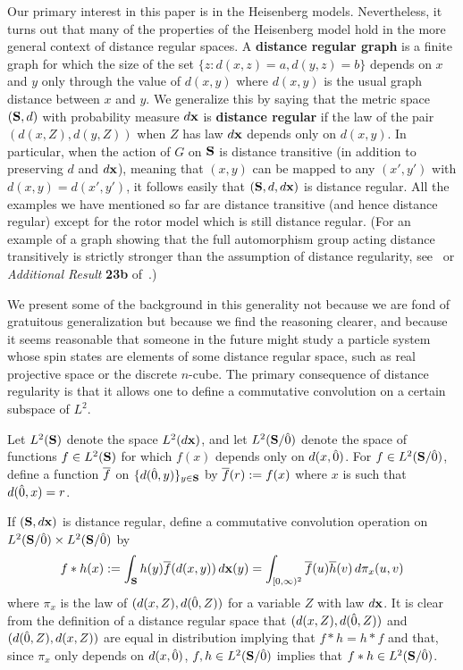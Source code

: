Our primary interest in this paper is in the Heisenberg models.
Nevertheless, it turns out that many of the properties of the Heisenberg model
hold in the more general context of distance regular spaces.
A {\bf distance regular graph} is a finite graph for
which the size of the set $\{ z : d(x,z) = a , d (y,z) = b \}$ 
depends on $x$ and $y$ only through the value of $d(x,y)$ where
$d(x,y)$ is the usual graph distance between $x$ and $y$.
We generalize this by saying that the metric space $(\S,d)$ 
with probability measure 
$\dx$ is {\bf distance regular} if the law of the pair $(d(x,Z) , d(y,Z))$
when $Z$ has law $\dx$ depends only on $d(x,y)$.  
In particular, when the action of $G$ on $\S$ is distance transitive
(in addition to preserving $d$ and $\dx$), 
meaning that $(x,y)$ can be mapped to any $(x' , y')$ with 
$d(x,y) = d(x' , y')$, it follows easily that $(\S,d, \dx)$ is 
distance regular.  All the examples we have mentioned so far are distance 
transitive (and hence distance regular) 
except for the rotor model which is still distance regular.
(For an example of a graph showing that the full automorphism group
acting distance transitively
is strictly stronger than the assumption of distance 
regularity, see~\cite{AVLF} or 
{\it Additional Result} {\bf 23b} of~\cite{Big}.)  

We present some of the background in this generality not because 
we are fond of gratuitous generalization but because we find the 
reasoning clearer, and because it seems reasonable that
someone in the future might study a particle system whose 
spin states are elements of some distance regular space, 
such as real projective space or the discrete $n$-cube.  The primary
consequence of distance regularity is that it allows one to define
a commutative convolution on a certain subspace of $L^2$.

\begin{defn} 
Let $\lts$ denote the space $L^2 (\dx)$, and let $\ltsg$ denote
the space of functions $f \in \lts$ for which $f(x)$ depends
only on $d(x , \zero)$.  For $f \in \ltsg$, define a function $\fb$
on $\{d(\zero,y)\}_{y\in \S}$ 
by $\fb (r) := f(x)$ where $x$ is such that $d(\zero,x) = r$.
\end{defn}

\begin{defn}
If $(\S,\dx)$ is distance regular,
define a commutative convolution operation on $\ltsg \times \ltsg$ by 
$$f * h (x) :=  \int_{\S} h(y) \fb (d(x,y)) \, \dx (y) = 
   \int_{[0,\infty)^2} \fb (u) \hb (v) \, d\pi_x(u,v)$$
where $\pi_x$ is the law of $(d(x,Z) , d(\zero , Z))$ for a variable
$Z$ with law $\dx$.  It is clear from the definition of a
distance regular space that $(d(x,Z) , d(\zero,Z))$ and
$(d(\zero,Z) , d(x,Z))$ are equal in distribution implying
that $f * h =h * f$ and that, since $\pi_x$ only depends on $d(x,\zero)$,
$f,h\in \ltsg$ implies that $f * h \in \ltsg$.
\end{defn} 

